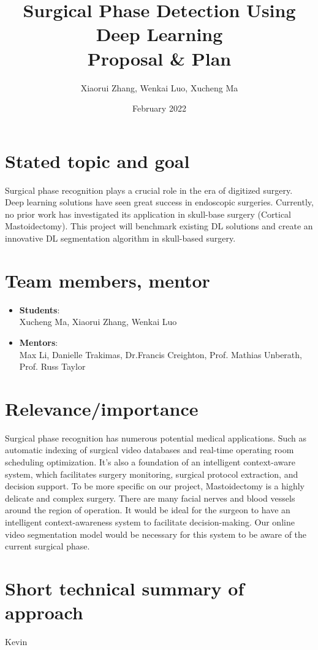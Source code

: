 \documentclass[11pt]{article} \usepackage[top=1in, bottom=1in, left=1in, right=1in]{geometry}
\title{Surgical Phase Detection Using Deep Learning\\ Proposal \& Plan}
\author{Xiaorui Zhang, Wenkai Luo, Xucheng Ma}
\date{February 2022}
\begin{document}
\maketitle

\section{Stated topic and goal}
Surgical phase recognition plays a crucial role in the era of digitized surgery. Deep learning solutions have seen great success in endoscopic surgeries. Currently, no prior work has investigated its application in skull-base surgery (Cortical Mastoidectomy). This project will benchmark existing DL solutions and create an innovative DL segmentation algorithm in skull-based surgery.

\section{Team members, mentor}
\begin{itemize}
    \item \textbf{Students}:\\Xucheng Ma, Xiaorui Zhang, Wenkai Luo
    \item \textbf{Mentors}:\\Max Li, Danielle Trakimas, Dr.Francis Creighton, Prof. Mathias Unberath, Prof. Russ Taylor
\end{itemize}

\section{Relevance/importance}
Surgical phase recognition has numerous potential medical applications. Such as automatic indexing of surgical video databases and real-time operating room scheduling optimization. It’s also a foundation of an intelligent context-aware system, which facilitates surgery monitoring, surgical protocol extraction, and decision support. To be more specific on our project, Mastoidectomy is a highly delicate and complex surgery. There are many facial nerves and blood vessels around the region of operation. It would be ideal for the surgeon to have an intelligent context-awareness system to facilitate decision-making. Our online video segmentation model would be necessary for this system to be aware of the current surgical phase. 
\section{Short technical summary of approach}
Kevin
\end{document}

